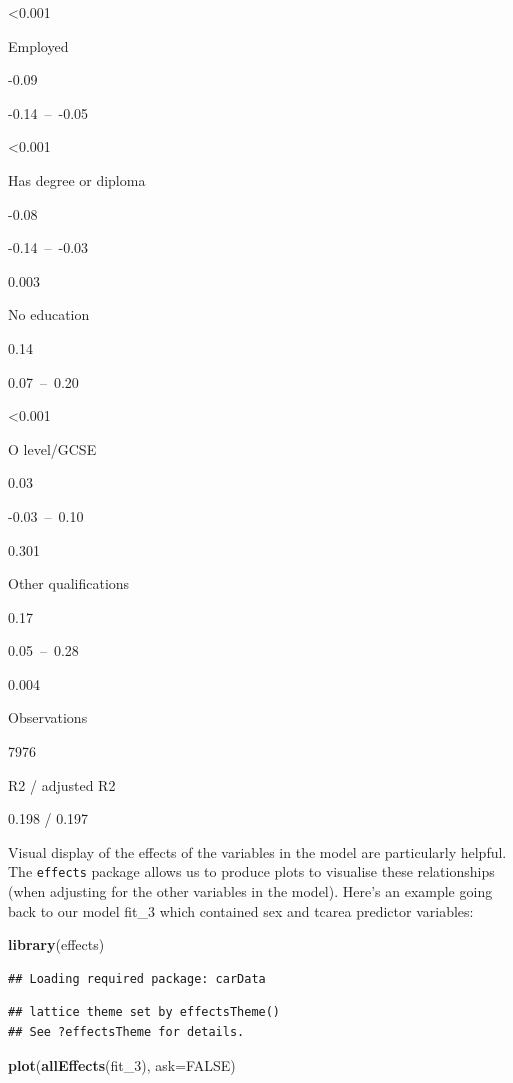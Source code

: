 \documentclass[]{book}
\newenvironment{Shaded}{\begin{snugshade}}{\end{snugshade}}
\newcommand{\DataTypeTok}[1]{\textcolor[rgb]{0.13,0.29,0.53}{#1}}
\newcommand{\DecValTok}[1]{\textcolor[rgb]{0.00,0.00,0.81}{#1}}
\newcommand{\KeywordTok}[1]{\textcolor[rgb]{0.13,0.29,0.53}{\textbf{#1}}}
\newcommand{\NormalTok}[1]{#1}
\newcommand{\OtherTok}[1]{\textcolor[rgb]{0.56,0.35,0.01}{#1}}
\theoremstyle{definition}
\theoremstyle{definition}
\theoremstyle{definition}
\theoremstyle{remark}
\begin{document}
\textless{}0.001

Employed

-0.09

-0.14~--~-0.05

\textless{}0.001

Has degree or diploma

-0.08

-0.14~--~-0.03

0.003

No education

0.14

0.07~--~0.20

\textless{}0.001

O level/GCSE

0.03

-0.03~--~0.10

0.301

Other qualifications

0.17

0.05~--~0.28

0.004

Observations

7976

R2 / adjusted R2

0.198 / 0.197

Visual display of the effects of the variables in the model are
particularly helpful. The \texttt{effects} package allows us to produce
plots to visualise these relationships (when adjusting for the other
variables in the model). Here's an example going back to our model
fit\_3 which contained sex and tcarea predictor variables:

\begin{Shaded}
\begin{Highlighting}[]
\KeywordTok{library}\NormalTok{(effects)}
\end{Highlighting}
\end{Shaded}

\begin{verbatim}
## Loading required package: carData
\end{verbatim}

\begin{verbatim}
## lattice theme set by effectsTheme()
## See ?effectsTheme for details.
\end{verbatim}

\begin{Shaded}
\begin{Highlighting}[]
\KeywordTok{plot}\NormalTok{(}\KeywordTok{allEffects}\NormalTok{(fit_}\DecValTok{3}\NormalTok{), }\DataTypeTok{ask=}\OtherTok{FALSE}\NormalTok{)}
\end{Highlighting}
\end{Shaded}
\end{document}
